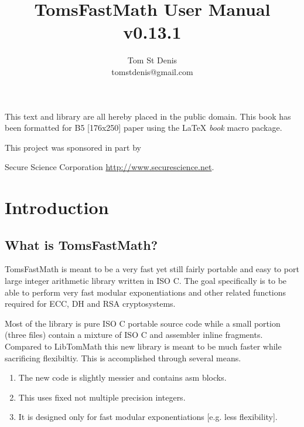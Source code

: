 \documentclass[b5paper]{book}
\begin{document}
\frontmatter
\pagestyle{empty}
\title{TomsFastMath User Manual \\ v0.13.1}
\author{Tom St Denis \\ tomstdenis@gmail.com}
\maketitle
This text and library are all hereby placed in the public domain.  This book has been formatted for B5 
[176x250] paper using the \LaTeX{} {\em book} macro package.

\vspace{13cm}

\begin{flushleft}This project was sponsored in part by  

Secure Science Corporation \url{http://www.securescience.net}.
\end{flushleft}

\tableofcontents
\listoffigures
\mainmatter
\pagestyle{headings}
\chapter{Introduction}
\section{What is TomsFastMath?}

TomsFastMath is meant to be a very fast yet still fairly portable and easy to port large
integer arithmetic library written in ISO C.  The goal specifically is to be able to perform
very fast modular exponentiations and other related functions required for ECC, DH and RSA
cryptosystems.

Most of the library is pure ISO C portable source code while a small portion (three files) contain
a mixture of ISO C and assembler inline fragments.  Compared to LibTomMath this new library is 
meant to be much faster while sacrificing flexibiltiy.  This is accomplished through several means.

\begin{enumerate}
   \item The new code is slightly messier and contains asm blocks.
   \item This uses fixed not multiple precision integers.  
   \item It is designed only for fast modular exponentiations [e.g. less flexibility].
\end{enumerate}
\end{document}
